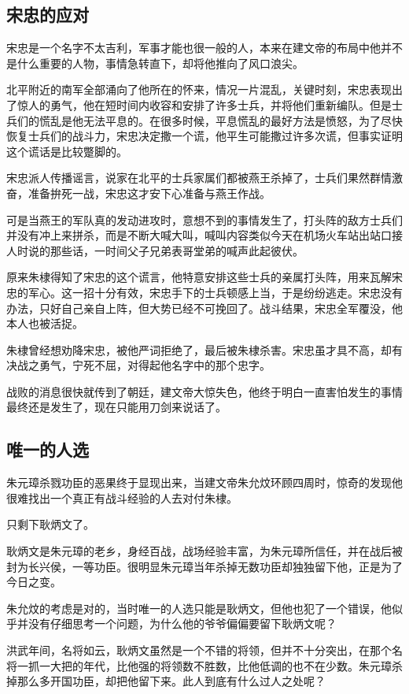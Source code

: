 \begin{multicols}{\theparacolNo}
		\subsection{宋忠的应对}
		宋忠是一个名字不太吉利，军事才能也很一般的人，本来在建文帝的布局中他并不是什么重要的人物，事情急转直下，却将他推向了风口浪尖。

		北平附近的南军全部涌向了他所在的怀来，情况一片混乱，关键时刻，宋忠表现出了惊人的勇气，他在短时间内收容和安排了许多士兵，并将他们重新编队。但是士兵们的慌乱是他无法平息的。在很多时候，平息慌乱的最好方法是愤怒，为了尽快恢复士兵们的战斗力，宋忠决定撒一个谎，他平生可能撒过许多次谎，但事实证明这个谎话是比较蹩脚的。

		宋忠派人传播谣言，说家在北平的士兵家属们都被燕王杀掉了，士兵们果然群情激奋，准备拚死一战，宋忠这才安下心准备与燕王作战。

		可是当燕王的军队真的发动进攻时，意想不到的事情发生了，打头阵的敌方士兵们并没有冲上来拼杀，而是不断大喊大叫，喊叫内容类似今天在机场火车站出站口接人时说的那些话，一时间父子兄弟表哥堂弟的喊声此起彼伏。

		原来朱棣得知了宋忠的这个谎言，他特意安排这些士兵的亲属打头阵，用来瓦解宋忠的军心。这一招十分有效，宋忠手下的士兵顿感上当，于是纷纷逃走。宋忠没有办法，只好自己亲自上阵，但大势已经不可挽回了。战斗结果，宋忠全军覆没，他本人也被活捉。

		朱棣曾经想劝降宋忠，被他严词拒绝了，最后被朱棣杀害。宋忠虽才具不高，却有决战之勇气，宁死不屈，对得起他名字中的那个忠字。

		战败的消息很快就传到了朝廷，建文帝大惊失色，他终于明白一直害怕发生的事情最终还是发生了，现在只能用刀剑来说话了。

		\subsection{唯一的人选}
		朱元璋杀戮功臣的恶果终于显现出来，当建文帝朱允炆环顾四周时，惊奇的发现他很难找出一个真正有战斗经验的人去对付朱棣。

		只剩下耿炳文了。

		耿炳文是朱元璋的老乡，身经百战，战场经验丰富，为朱元璋所信任，并在战后被封为长兴侯，一等功臣。很明显朱元璋当年杀掉无数功臣却独独留下他，正是为了今日之变。

		朱允炆的考虑是对的，当时唯一的人选只能是耿炳文，但他也犯了一个错误，他似乎并没有仔细思考一个问题，为什么他的爷爷偏偏要留下耿炳文呢？

		洪武年间，名将如云，耿炳文虽然是一个不错的将领，但并不十分突出，在那个名将一抓一大把的年代，比他强的将领数不胜数，比他低调的也不在少数。朱元璋杀掉那么多开国功臣，却把他留下来。此人到底有什么过人之处呢？


\end{multicols}
